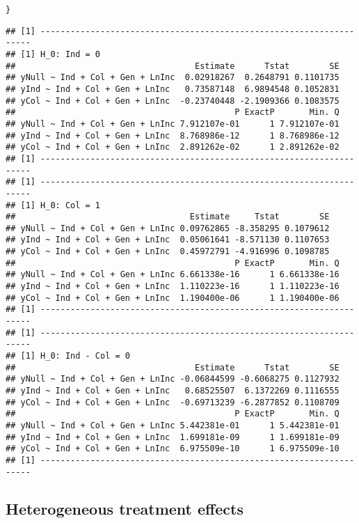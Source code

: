 \documentclass[11pt, a4paper]{article}\usepackage[]{graphicx}\usepackage[]{color}
\makeatletter
\newcommand{\hlstd}[1]{\textcolor[rgb]{0.345,0.345,0.345}{#1}}%
\newenvironment{kframe}{%
 \def\at@end@of@kframe{}%
 \ifinner\ifhmode%
  \def\at@end@of@kframe{\end{minipage}}%
  \begin{minipage}{\columnwidth}%
 \fi\fi%
 \def\FrameCommand##1{\hskip\@totalleftmargin \hskip-\fboxsep
 \colorbox{shadecolor}{##1}\hskip-\fboxsep
     \hskip-\linewidth \hskip-\@totalleftmargin \hskip\columnwidth}%
 \MakeFramed {\advance\hsize-\width
   \@totalleftmargin\z@ \linewidth\hsize
   \@setminipage}}%
 {\par\unskip\endMakeFramed%
 \at@end@of@kframe}
\newenvironment{knitrout}{}{} %
\makeatother
\begin{document}
\begin{knitrout}
\begin{kframe}
\begin{alltt}
    \hlstd{\}}
\end{alltt}
\begin{verbatim}
## [1] --------------------------------------------------------------------
## [1] H_0: Ind = 0
##                                    Estimate      Tstat        SE
## yNull ~ Ind + Col + Gen + LnInc  0.02918267  0.2648791 0.1101735
## yInd ~ Ind + Col + Gen + LnInc   0.73587148  6.9894548 0.1052831
## yCol ~ Ind + Col + Gen + LnInc  -0.23740448 -2.1909366 0.1083575
##                                            P ExactP       Min. Q
## yNull ~ Ind + Col + Gen + LnInc 7.912107e-01      1 7.912107e-01
## yInd ~ Ind + Col + Gen + LnInc  8.768986e-12      1 8.768986e-12
## yCol ~ Ind + Col + Gen + LnInc  2.891262e-02      1 2.891262e-02
## [1] --------------------------------------------------------------------
## [1] --------------------------------------------------------------------
## [1] H_0: Col = 1
##                                   Estimate     Tstat        SE
## yNull ~ Ind + Col + Gen + LnInc 0.09762865 -8.358295 0.1079612
## yInd ~ Ind + Col + Gen + LnInc  0.05061641 -8.571130 0.1107653
## yCol ~ Ind + Col + Gen + LnInc  0.45972791 -4.916996 0.1098785
##                                            P ExactP       Min. Q
## yNull ~ Ind + Col + Gen + LnInc 6.661338e-16      1 6.661338e-16
## yInd ~ Ind + Col + Gen + LnInc  1.110223e-16      1 1.110223e-16
## yCol ~ Ind + Col + Gen + LnInc  1.190400e-06      1 1.190400e-06
## [1] --------------------------------------------------------------------
## [1] --------------------------------------------------------------------
## [1] H_0: Ind - Col = 0
##                                    Estimate      Tstat        SE
## yNull ~ Ind + Col + Gen + LnInc -0.06844599 -0.6068275 0.1127932
## yInd ~ Ind + Col + Gen + LnInc   0.68525507  6.1372269 0.1116555
## yCol ~ Ind + Col + Gen + LnInc  -0.69713239 -6.2877852 0.1108709
##                                            P ExactP       Min. Q
## yNull ~ Ind + Col + Gen + LnInc 5.442381e-01      1 5.442381e-01
## yInd ~ Ind + Col + Gen + LnInc  1.699181e-09      1 1.699181e-09
## yCol ~ Ind + Col + Gen + LnInc  6.975509e-10      1 6.975509e-10
## [1] --------------------------------------------------------------------
\end{verbatim}
\end{kframe}
\end{knitrout}

    \subsection{Heterogeneous treatment effects}
\end{document}
